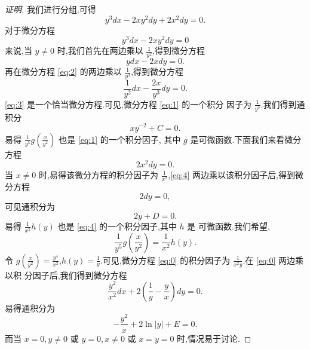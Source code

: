 \documentclass[a4paper, 12pt]{article} %
\begin{document}
\begin{CJK}{UTF8}{gkai}
\begin{proof}[证明]
我们进行分组.可得
$$
y^3dx-2xy^2dy+2x^2dy=0.
$$
对于微分方程
\begin{equation}
  \label{eq:1}
  y^3dx-2xy^2dy=0
\end{equation}
来说,当 $y\neq 0$ 时,我们首先在两边乘以 $\frac{1}{y^2}$,得到微分方程
\begin{equation}
  \label{eq:2}
  ydx-2xdy=0.
\end{equation}
再在微分方程 \eqref{eq:2} 的两边乘以 $\frac{1}{y^3}$,得到微分方程
\begin{equation}
  \label{eq:3}
  \frac{1}{y^2}dx-\frac{2x}{y^3}dy=0.
\end{equation}
\eqref{eq:3} 是一个恰当微分方程.可见,微分方程 \eqref{eq:1} 的一个积分
因子为 $\frac{1}{y^5}$.我们得到通积分
$$
xy^{-2}+C=0.
$$
易得 $\frac{1}{y^5}g(\frac{x}{y^2})$ 也是 \eqref{eq:1} 的一个积分因子,
其中 $g$ 是可微函数.下面我们来看微分方程
\begin{equation}
  \label{eq:4}
  2x^2dy=0.
\end{equation}
当 $x\neq 0$ 时,易得该微分方程的积分因子为
$\frac{1}{x^2}$,\eqref{eq:4} 两边乘以该积分因子后,得到微分方程
$$
2dy=0,
$$
可见通积分为
$$
2y+D=0.
$$
易得 $\frac{1}{x^2}h(y)$ 也是 \eqref{eq:4} 的一个积分因子,其中 $h$ 是
可微函数.我们希望,
$$
\frac{1}{y^5}g(\frac{x}{y^2})=\frac{1}{x^2}h(y).
$$
令 $g(\frac{x}{y^2})=\frac{y^4}{x^2}$,$h(y)=\frac{1}{y}$.可见,微分方程
\eqref{eq:0} 的积分因子为 $\frac{1}{x^2y}$.在 \eqref{eq:0} 两边乘以积
分因子后,我们得到微分方程
\begin{equation}
  \label{eq:7}
  \frac{y^2}{x^2}dx+2(\frac{1}{y}-\frac{y}{x})dy=0.
\end{equation}
易得通积分为
$$
-\frac{y^2}{x}+2\ln |y|+E=0.
$$
而当 $x=0,y\neq 0$ 或 $y=0,x\neq 0$ 或 $x=y=0$ 时,情况易于讨论.
\begin{comment}
来说,积分因子为 $\frac{1}{xy^{3}}$.将积分因子乘上 \eqref{eq:1} 的两侧后,得
到
$$
\frac{1}{x}dx-\frac{2}{y}dy=0.
$$
可得通积分为
$$
\ln |x|-2\ln |y|+C=0.
$$
易得 $\frac{1}{xy^3}g($
\end{comment}
\begin{comment}
微分方程两边同时乘以非零函数 $u(x,y)$,得到
\begin{equation}\label{eq:1}
uy^3dx+2u(x^2-xy^2)dy=0.
\end{equation}
我们希望 \eqref{eq:1} 是恰当的,即
$$
\frac{\pa u}{\pa y}y^3+3y^2u=\frac{\pa u}{\oa x}(2x^2-2xy^2)+u(4x-2y^2),
$$
即
$$
\frac{\pa u}{\pa y}y^3+(5y^2-4x)u=\frac{\pa u}{\pa x}(2x^2-2xy^2).
$$
我们让 $u$ 是只关于 $x$ 的函数,可得
$$
4(y^2-x)u=2x(x-y^{2})\frac{du}{dx}
$$
当 $x\neq 0$ 时,不妨让 $u=\frac{1}{x^{2}}$.因此我们得到恰当微分方程
\begin{equation}
  \label{eq:2}
  \frac{y^3}{x^2}dx+2(1-\frac{y^2}{x})dy=0.
\end{equation}
设二元函数 $\phi(x,y)$ 满足
$$
\frac{\pa \phi}{\pa x}=\frac{y^3}{x^2}\ri \phi=-y^3 \frac{1}{x}+f(y).
$$
因此
$$
-\frac{3}{x}y^2+f'(y)=
$$
\end{comment}
  \end{proof}
  

\end{CJK}
\end{document}
